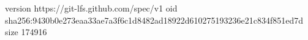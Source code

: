 version https://git-lfs.github.com/spec/v1
oid sha256:9430b0e273eaa33ae7a3f6c1d8482ad18922d610275193236e21c834f851ed7d
size 174916
